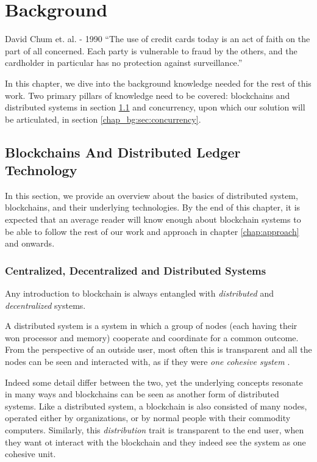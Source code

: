 \chapter{Background} \label{chap:background}

\begin{chapquote}{David Chum et. al. - 1990}
``The use of credit cards today is an act of faith on the part of all concerned. Each party is
vulnerable to fraud by the others, and the cardholder in particular has no protection against
surveillance.''
\end{chapquote}


In this chapter, we dive into the background knowledge needed for the rest of this work. Two primary
pillars of knowledge need to be covered: blockchains and distributed systems in section
\ref{chap_bg:sec:blockchains} and concurrency, upon which our solution will be articulated, in
section \ref{chap_bg:sec:concurrency}.

\section{Blockchains And Distributed Ledger Technology} \label{chap_bg:sec:blockchains}

In this section, we provide an overview about the basics of distributed system, blockchains, and
their underlying technologies. By the end of this chapter, it is expected that an average reader
will know enough about blockchain systems to be able to follow the rest of our work and approach in
chapter \ref{chap:approach} and onwards.

\subsection{Centralized, Decentralized and Distributed Systems}

Any introduction to blockchain is always entangled with \textit{distributed} and
\textit{decentralized} systems.

A distributed system is a system in which a group of nodes (each having their won processor and
memory) cooperate and coordinate for a common outcome. From the perspective of an outside user, most
often this is transparent and all the nodes can be seen and interacted with, as if they were
\textit{one cohesive system} \cite{bashirMASTERINGBLOCKCHAINDistributed2018}.

Indeed some detail differ between the two, yet the underlying concepts resonate in many ways
\cite{herlihyBlockchainsDistributedComputing2019} and blockchains can be seen as another form of
distributed systems. Like a distributed system, a blockchain is also consisted of many nodes,
operated either by organizations, or by normal people with their commodity computers. Similarly,
this \textit{distribution} trait is transparent to the end user, when they want ot interact with the
blockchain and they indeed see the system as one cohesive unit.

